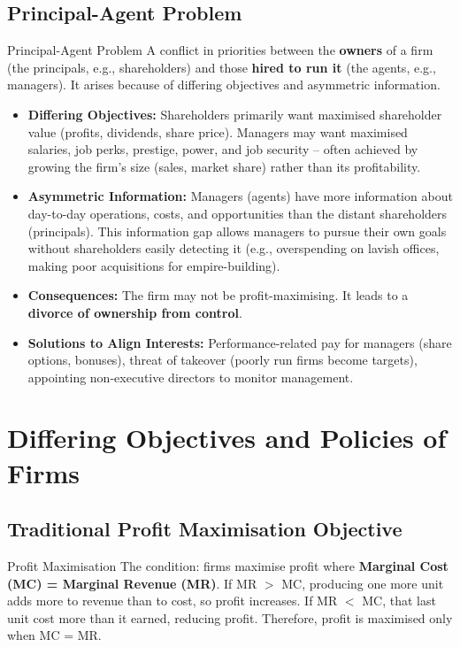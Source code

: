 \documentclass[11pt, a4paper, twoside]{book}
\begin{document}
\subsection{Principal-Agent Problem}

\begin{keyterm}{Principal-Agent Problem}
A conflict in priorities between the \textbf{owners} of a firm (the principals, e.g., shareholders) and those \textbf{hired to run it} (the agents, e.g., managers). It arises because of differing objectives and asymmetric information.
\end{keyterm}

\begin{itemize}
  \item \textbf{Differing Objectives:} Shareholders primarily want maximised shareholder value (profits, dividends, share price). Managers may want maximised salaries, job perks, prestige, power, and job security -- often achieved by growing the firm's size (sales, market share) rather than its profitability.
  \item \textbf{Asymmetric Information:} Managers (agents) have more information about day-to-day operations, costs, and opportunities than the distant shareholders (principals). This information gap allows managers to pursue their own goals without shareholders easily detecting it (e.g., overspending on lavish offices, making poor acquisitions for empire-building).
  \item \textbf{Consequences:} The firm may not be profit-maximising. It leads to a \textbf{divorce of ownership from control}.
  \item \textbf{Solutions to Align Interests:} Performance-related pay for managers (share options, bonuses), threat of takeover (poorly run firms become targets), appointing non-executive directors to monitor management.
\end{itemize}

\section{Differing Objectives and Policies of Firms}

\subsection{Traditional Profit Maximisation Objective}

\begin{keyterm}{Profit Maximisation}
The condition: firms maximise profit where \textbf{Marginal Cost (MC) = Marginal Revenue (MR)}. If MR $>$ MC, producing one more unit adds more to revenue than to cost, so profit increases. If MR $<$ MC, that last unit cost more than it earned, reducing profit. Therefore, profit is maximised only when MC = MR.
\end{keyterm}
\end{document}
